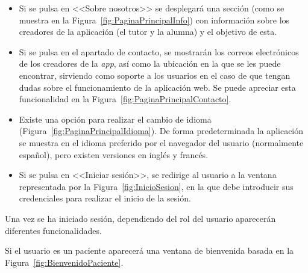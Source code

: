 \begin{itemize}
    \item Si se pulsa en <<Sobre nosotros>> se desplegará una sección (como se muestra en la Figura~\ref{fig:PaginaPrincipalInfo}) con información sobre los creadores de la aplicación (el tutor y la alumna) y el objetivo de esta.
    


    \item Si se pulsa en el apartado de contacto, se mostrarán los correos electrónicos de los creadores de la \textit{app}, así como la ubicación en la que se les puede encontrar, sirviendo como soporte a los usuarios en el caso de que tengan dudas sobre el funcionamiento de la aplicación web. Se puede apreciar esta funcionalidad en la Figura~\ref{fig:PaginaPrincipalContacto}.
    


    \item Existe una opción para realizar el cambio de idioma (Figura~\ref{fig:PaginaPrincipalIdioma}). De forma predeterminada la aplicación se muestra en el idioma preferido por el navegador del usuario (normalmente español), pero existen versiones en inglés y francés.
    


    \item Si se pulsa en <<Iniciar sesión>>, se redirige al usuario a la ventana representada por la Figura~\ref{fig:InicioSesion}, en la que debe introducir sus credenciales para realizar el inicio de la sesión.
    
\end{itemize}

Una vez se ha iniciado sesión, dependiendo del rol del usuario aparecerán diferentes funcionalidades.

Si el usuario es un paciente aparecerá una ventana de bienvenida basada en la Figura~\ref{fig:BienvenidoPaciente}. 


